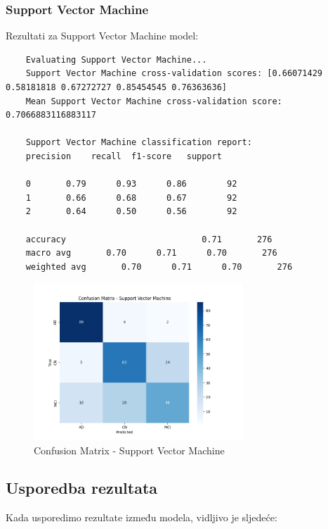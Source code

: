 \documentclass[zavrsnirad]{fer}
\begin{document}
\subsubsection{Support Vector Machine}

Rezultati za Support Vector Machine model:

\begin{verbatim}
	Evaluating Support Vector Machine...
	Support Vector Machine cross-validation scores: [0.66071429 0.58181818 0.67272727 0.85454545 0.76363636]
	Mean Support Vector Machine cross-validation score: 0.7066883116883117
	
	Support Vector Machine classification report:
	precision    recall  f1-score   support
	
	0       0.79      0.93      0.86        92
	1       0.66      0.68      0.67        92
	2       0.64      0.50      0.56        92
	
	accuracy                           0.71       276
	macro avg       0.70      0.71      0.70       276
	weighted avg       0.70      0.71      0.70       276

\end{verbatim}

\begin{figure}[h]
	\centering
	\includegraphics[width=0.7\textwidth]{Figures/matrix_svm.png}
	\caption{Confusion Matrix - Support Vector Machine}
	\label{fig:matrix_svm}
\end{figure}


\subsection{Usporedba rezultata}

Kada usporedimo rezultate između modela, vidljivo je sljedeće:
\end{document}

